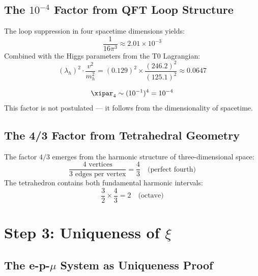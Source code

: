 \subsection{The \texorpdfstring{$10^{-4}$}{10\^(-4)} Factor from QFT Loop Structure}

The loop suppression in four spacetime dimensions yields:
\begin{equation}
	\frac{1}{16\pi^3} \approx 2{.}01 \times 10^{-3}
\end{equation}
Combined with the Higgs parameters from the T0 Lagrangian:
\begin{equation}
	(\lambda_h)^2 \cdot \frac{v^2}{m_h^2} = (0{.}129)^2 \times \frac{(246{.}2)^2}{(125{.}1)^2} \approx 0{.}0647
\end{equation}

\begin{keyresult}
\begin{equation}
	\xipar_4 \sim (10^{-1})^4 = 10^{-4}
\end{equation}
This factor is not postulated — it follows from the dimensionality of spacetime.
\end{keyresult}

\subsection{The 4/3 Factor from Tetrahedral Geometry}

The factor $4/3$ emerges from the harmonic structure of three-dimensional space:
\begin{equation}
	\frac{4 \text{ vertices}}{3 \text{ edges per vertex}} = \frac{4}{3} \quad \text{(perfect fourth)}
\end{equation}
The tetrahedron contains both fundamental harmonic intervals:
\begin{equation}
	\frac{3}{2} \times \frac{4}{3} = 2 \quad \text{(octave)}
\end{equation}

\section{Step 3: Uniqueness of \texorpdfstring{$\xi$}{xi}}

\subsection{The e-p-\texorpdfstring{$\mu$}{mu} System as Uniqueness Proof}

